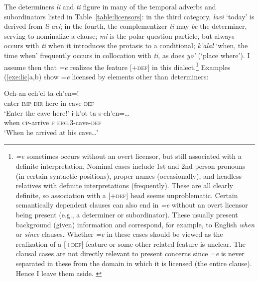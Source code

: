 \documentclass[output=paper,
modfonts
]{LSP/langsci}
\begin{document}
The determiners \emph{li} and \emph{ti} figure in many of the temporal adverbs and subordinators listed in Table~\ref{table:licensors}:
in the third category, \emph{lavi} `today' is derived from \emph{li avi}; in the fourth, the complementizer \emph{ti} may \emph{be}
the determiner, serving to nominalize a clause;  \emph{mi} is the polar question particle, but always occurs with \emph{ti} when it 
introduces the protasis to a conditional;  \emph{k'alal} `when, the time when' frequently occurs in collocation with \emph{ti}, as does \emph{yo'} (`place 
where'). I assume then that  \emph{=e} realizes the feature [\textsc{+def}]  in this dialect.\footnote
{\emph{=e} sometimes occurs without an overt licensor, but still associated with a definite interpretation. 
Nominal cases include 1st and 2nd person pronouns (in certain syntactic positions), proper names (occasionally), and headless relatives with definite interpretations (frequently). 
These are all clearly definite, so association with a [\textsc{+def}] head seems unproblematic.
Certain semantically dependent clauses can also end in \emph{=e} without an overt licensor being present  (e.g., a determiner or subordinator). 
These usually present background (given) information and correspond, for example, to English \emph{when} or \emph{since} clauses. 
Whether \emph{=e} in these cases should be viewed as the realization of a [+\textsc{def}] feature or some other related feature is unclear. 
 The clausal cases are not directly relevant to present concerns since \emph{=e} is never separated in these from the domain in which it is licensed  (the entire clause).
 Hence I leave them aside.
 \label{footnote:clausal}
 }
Examples (\ref{exe:lic}a,b) show =\emph{e} licensed by elements other than determiners:
\begin{exe}
\ex\label{exe:lic}
\begin{xlist}
\bridgeoverex
{}
\gll Och-an ech'el  ta ch'en=!\\
enter-\textsc{imp} \textsc{dir} here in cave-\textsc{def} \\
\glt `Enter the cave here!'  \citep[71]{laughlin1977}
\bridgeoverex
{}
\gll {} i-k'ot ta s-ch'en=\dots \\
when \textsc{cp}-arrive \textsc{p} \textsc{erg.3}-cave-\textsc{def} \\
\glt `When he arrived at his cave\dots' \citep[72]{laughlin1977}
\end{xlist}
\end{exe}
\end{document}
